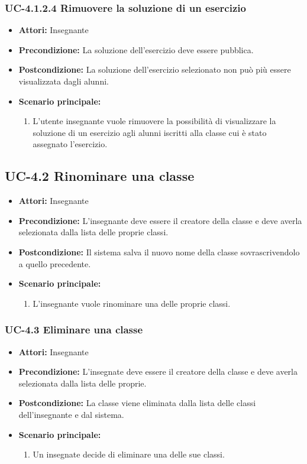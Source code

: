 \subsubsection{UC-4.1.2.4 Rimuovere la soluzione di un esercizio}
\begin{itemize}
		\item \textbf{Attori: } Insegnante
		\item \textbf{Precondizione: }  La soluzione dell'esercizio deve essere pubblica.
		\item \textbf{Postcondizione: } La soluzione dell'esercizio selezionato non può più essere visualizzata dagli alunni.
		\item \textbf{Scenario principale: } 
		\begin{enumerate}
			\item L'utente insegnante vuole rimuovere la possibilità di visualizzare la soluzione di un esercizio agli alunni iscritti alla classe cui è stato assegnato l'esercizio.
		\end{enumerate}
	\end{itemize}
\subsection{UC-4.2 Rinominare una classe}
\begin{itemize}
	\item \textbf{Attori:} Insegnante
	\item \textbf{Precondizione:} L'insegnante deve essere il creatore della classe e deve averla selezionata dalla lista delle proprie classi.
	\item \textbf{Postcondizione:} Il sistema salva il nuovo nome della classe sovrascrivendolo a quello precedente.
	\item \textbf{Scenario principale:} 
	\begin{enumerate}
			\item L'insegnante vuole rinominare una delle proprie classi.
		\end{enumerate}
\end{itemize}
\subsubsection{UC-4.3 Eliminare una classe}
\begin{itemize}
		\item \textbf{Attori: } Insegnante
		\item \textbf{Precondizione: }  L'insegnate deve essere il creatore della classe e deve averla selezionata dalla lista delle proprie.
		\item \textbf{Postcondizione: } La classe viene eliminata dalla lista delle classi dell'insegnante e dal sistema.
		\item \textbf{Scenario principale: } 
		\begin{enumerate}
			\item Un insegnate decide di eliminare una delle sue classi. 
		\end{enumerate}
	\end{itemize}


